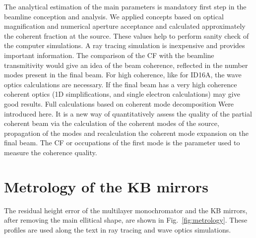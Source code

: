 \documentclass{iucr}              %
\newcommand{\todo}[1]{{\color{red}[TODO: "#1'']}}
\begin{document}
The analytical estimation of the main parameters is mandatory first step in the beamline conception and analysis. We applied concepts based on optical magnification and numerical aperture acceptance and calculated approximately the coherent fraction at the source. These values help to perform sanity check of the computer simulations. A ray tracing simulation is inexpensive and provides important information. The comparison of the CF with the beamline transmitivity would give an idea of the beam coherence, reflected in the number modes present in the final beam. For high coherence, like for ID16A, the wave optics calculations are necessary. If the final beam has a very high coherence coherent optics (1D simplifications, and single electron calculations) may give good results. Full calculations based on coherent mode decomposition Were introduced here. It is a new way of quantitatively assess the quality of the partial coherent beam via the calculation of the coherent modes of the source, propagation of the modes and recalculation the coherent mode expansion on the final beam. The CF or occupations of the first mode is the parameter used to measure the coherence quality. 



% 



\appendix

\section{Metrology of the KB mirrors}
\label{appendix:metrology}
The residual height error of the multilayer monochromator and the KB mirrors, after removing the main ellitical shape, are shown in Fig.~\ref{fig:metrology}. These profiles are used along the text in ray tracing and wave optics simulations.
\end{document}
